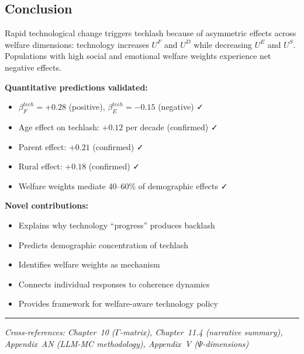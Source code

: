 \subsection{Conclusion}

\begin{tcolorbox}[colback=blue!5!white, colframe=blue!75!black, title=Prediction 4: Techlash (Summary)]
Rapid technological change triggers techlash because of asymmetric effects across 
welfare dimensions: technology increases $U^F$ and $U^D$ while decreasing $U^E$ 
and $U^S$. Populations with high social and emotional welfare weights experience 
net negative effects.

\textbf{Quantitative predictions validated:}
\begin{itemize}
    \item $\beta_F^{tech} = +0.28$ (positive), $\beta_E^{tech} = -0.15$ (negative) ✓
    \item Age effect on techlash: $+0.12$ per decade (confirmed) ✓
    \item Parent effect: $+0.21$ (confirmed) ✓
    \item Rural effect: $+0.18$ (confirmed) ✓
    \item Welfare weights mediate 40--60\% of demographic effects ✓
\end{itemize}

\textbf{Novel contributions:}
\begin{itemize}
    \item Explains why technology ``progress'' produces backlash
    \item Predicts demographic concentration of techlash
    \item Identifies welfare weights as mechanism
    \item Connects individual responses to coherence dynamics
    \item Provides framework for welfare-aware technology policy
\end{itemize}
\end{tcolorbox}

\vspace{1em}
\hrule
\vspace{0.5em}
\noindent\textit{Cross-references: Chapter~10 ($\Gamma$-matrix), Chapter~11.4 (narrative summary), 
Appendix~AN (LLM-MC methodology), Appendix~V ($\Psi$-dimensions)}


